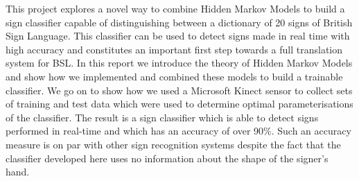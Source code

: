 


\begin{abstracts}        %

This project explores a novel way to combine Hidden Markov Models to build a sign classifier capable of distinguishing between a dictionary of 20 signs of British Sign Language. This classifier can be used to detect signs made in real time with high accuracy and constitutes an important first step towards a full translation system for BSL. In this report we introduce the theory of Hidden Markov Models and show how we implemented and combined these models to build a trainable classifier. We go on to show how we used a Microsoft Kinect sensor to collect sets of training and test data which were used to determine optimal parameterisations of the classifier. The result is a sign classifier which is able to detect signs performed in real-time and which has an accuracy of over 90\%. Such an accuracy measure is on par with other sign recognition systems despite the fact that the classifier developed here uses no information about the shape of the signer's hand.


\end{abstracts}




